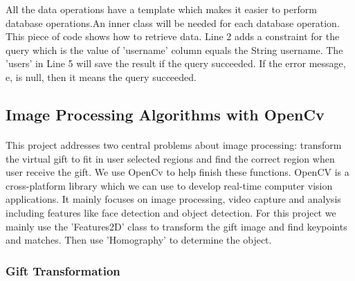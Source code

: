 \par All the data operations have a template which makes it easier to perform database operations.An inner class will be needed for each database operation. This piece of code shows how to retrieve data. Line 2 adds a constraint for the query which is the value of {\ttfamily 'username'} column equals the String username. The {\ttfamily 'users'} in Line 5 will save the result if the query succeeded. If the error message, {\ttfamily e}, is null, then it means the query succeeded. 
\subsection{Image Processing Algorithms with OpenCv}
\paragraph{}This project addresses two central problems about image processing: transform the virtual gift to fit in user selected regions and find the correct region when user receive the gift. We use OpenCv to help finish these functions. OpenCV is a cross-platform library which we can use to develop real-time computer vision applications. It mainly focuses on image processing, video capture and analysis including features like face detection and object detection. For this project we mainly use the 'Features2D' class to transform the gift image and find keypoints and matches. Then use 'Homography' to determine the object. 

\subsubsection{Gift Transformation}
